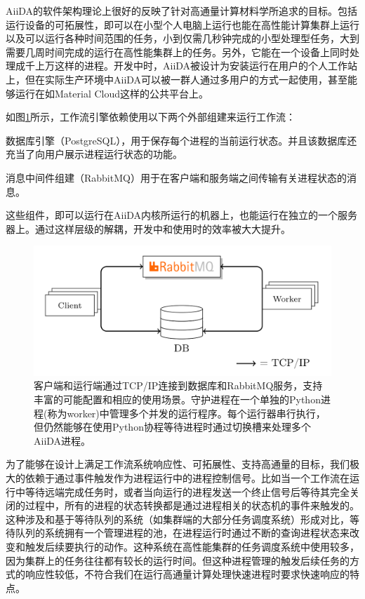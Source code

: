 AiiDA的软件架构理论上很好的反映了针对高通量计算材料学所追求的目标。包括运行设备的可拓展性，即可以在小型个人电脑上运行也能在高性能计算集群上运行以及可以运行各种时间范围的任务，小到仅需几秒钟完成的小型处理型任务，大到需要几周时间完成的运行在高性能集群上的任务。另外，它能在一个设备上同时处理成千上万这样的进程。开发中时，AiiDA被设计为安装运行在用户的个人工作站上，但在实际生产环境中AiiDA可以被一群人通过多用户的方式一起使用，甚至能够运行在如Material Cloud\cite{talirz2020materials}这样的公共平台上。

如图\ref{fig:client-worker}所示，工作流引擎依赖使用以下两个外部组建来运行工作流：
\begin{alphaenum}
    \item 数据库引擎（PostgreSQL\cite{postgresql}），用于保存每个进程的当前运行状态。并且该数据库还充当了向用户展示进程运行状态的功能。
    \item 消息中间件组建（RabbitMQ\cite{rabbitmq}）用于在客户端和服务端之间传输有关进程状态的消息。
\end{alphaenum}
这些组件，即可以运行在AiiDA内核所运行的机器上，也能运行在独立的一个服务器上。通过这样层级的解耦，开发中和使用时的效率被大大提升。

\begin{figure}
  \includegraphics[width=1.0\textwidth]{figs/db-rmq.png}
  \caption{客户端和运行端通过TCP/IP连接到数据库和RabbitMQ服务，支持丰富的可能配置和相应的使用场景。守护进程在一个单独的Python进程(称为worker)中管理多个并发的运行程序。每个运行器串行执行，但仍然能够在使用Python协程等待进程时通过切换槽来处理多个AiiDA进程。}
  \label{fig:client-worker}
\end{figure}

为了能够在设计上满足工作流系统响应性、可拓展性、支持高通量的目标，我们极大的依赖于通过事件触发作为进程运行中的进程控制信号。比如当一个工作流在运行中等待远端完成任务时，或者当向运行的进程发送一个终止信号后等待其完全关闭的过程中，所有的进程的状态转换都是通过进程相关的状态机的事件来触发的。这种涉及和基于等待队列的系统（如集群端的大部分任务调度系统）形成对比，等待队列的系统拥有一个管理进程的池，在进程运行时通过不断的查询进程状态来改变和触发后续要执行的动作。这种系统在高性能集群的任务调度系统中使用较多，因为集群上的任务往往都有较长的运行时间。但这种进程管理的触发后续任务的方式的响应性较低，不符合我们在运行高通量计算处理快速进程时要求快速响应的特点。

